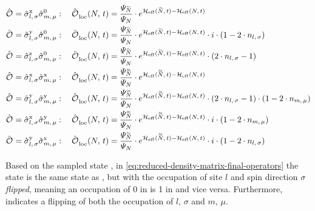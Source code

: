 \begin{equation}
    \label{eq:reduced-density-matrix-final-operators}
    \begin{split}
        \ObservableOp = \pauli[l,\,\sigma]{x} \pauli[m,\,\mu]{0}   &: \quad \localObservable{N}{t} =
        \frac{\psiN[\vphantom{N}\smash{\tilde{N}}]}{\psiN}        \cdot         e^{\HeffOft[\vphantom{N}\smash{\tilde{N}}]-\HeffOft[N]}
        \\
        \ObservableOp = \pauli[l,\,\sigma]{y} \pauli[m,\,\mu]{0}   &: \quad \localObservable{N}{t} =
        \frac{\psiN[\vphantom{N}\smash{\tilde{N}}]}{\psiN}        \cdot         e^{\HeffOft[\vphantom{N}\smash{\tilde{N}}]-\HeffOft[N]} \cdot i \cdot (1-2 \cdot n_{l,\,\sigma}) 
        \\
        \ObservableOp = \pauli[l,\,\sigma]{z} \pauli[m,\,\mu]{0}   &: \quad \localObservable{N}{t} =
        \frac{\psiN[\vphantom{N}\smash{\tilde{N}}]}{\psiN}        \cdot         e^{\HeffOft[\vphantom{N}\smash{\tilde{N}}]-\HeffOft[N]} \cdot (2 \cdot n_{l,\,\sigma} - 1) 
        \\
        \ObservableOp = \pauli[l,\,\sigma]{x} \pauli[m,\,\mu]{x}   &: \quad \localObservable{N}{t} =
        \frac{\psiN[\vphantom{N}\smash{\tildetilde{N}}]}{\psiN}        \cdot         e^{\HeffOft[\vphantom{N}\smash{\tildetilde{N}}]-\HeffOft[N]}
        \\
        \ObservableOp = \pauli[l,\,\sigma]{y} \pauli[m,\,\mu]{y}   &: \quad \localObservable{N}{t} =
        \frac{\psiN[\vphantom{N}\smash{\tildetilde{N}}]}{\psiN}        \cdot         e^{\HeffOft[\vphantom{N}\smash{\tildetilde{N}}]-\HeffOft[N]} \cdot (2 \cdot n_{l,\,\sigma} - 1) \cdot (1- 2 \cdot n_{m,\,\mu})
        \\
        \ObservableOp = \pauli[l,\,\sigma]{x} \pauli[m,\,\mu]{y}   &: \quad \localObservable{N}{t} =
        \frac{\psiN[\vphantom{N}\smash{\tildetilde{N}}]}{\psiN}        \cdot         e^{\HeffOft[\vphantom{N}\smash{\tildetilde{N}}]-\HeffOft[N]} \cdot i \cdot (1-2 \cdot n_{m,\,\mu}) 
        \\
        \ObservableOp = \pauli[l,\,\sigma]{y} \pauli[m,\,\mu]{x}   &: \quad \localObservable{N}{t} =
        \frac{\psiN[\vphantom{N}\smash{\tildetilde{N}}]}{\psiN}        \cdot         e^{\HeffOft[\vphantom{N}\smash{\tildetilde{N}}]-\HeffOft[N]} \cdot i \cdot (1-2 \cdot n_{l,\,\sigma}) 
    \end{split}
\end{equation}

Based on the sampled state \ketN[N], in \autoref{eq:reduced-density-matrix-final-operators} the state  is the same state as \ketN[N], but with the occupation of site $l$ and spin direction $\sigma$ \emph{flipped}, meaning an occupation of 0 in \ketN[N] is 1 in  and vice versa.
Furthermore,  indicates a flipping of both the occupation of $l,\, \sigma$ and $m,\, \mu$.

